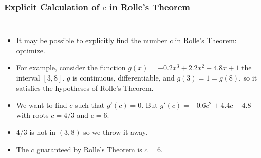 \documentclass[serif,ignorenonframetext]{beamer}
\begin{document}
\begin{frame}
  \frametitle{Explicit Calculation of $c$ in Rolle's Theorem}
  \begin{columns}
  \begin{itemize}[<+->]
  \item It may be possible to explicitly find the number $c$ 
    in Rolle's Theorem: optimize.
  \item For example, consider the function $g(x)=-0.2x^3+2.2x^2-4.8x+1$
    the interval $[3,8]$.  $g$ is continuous, differentiable, and
    $g(3)=1=g(8)$, so it satisfies the hypotheses of Rolle's Theorem.
  \item We want to find $c$ such that $g'(c)=0$.  But $g'(c)=-0.6c^2+4.4c-4.8$
    with roots $c=4/3$ and $c=6$.
  \item $4/3$ is not in $(3,8)$ so we throw it away.
  \item The $c$ guaranteed by Rolle's Theorem is $c=6$.
  \end{itemize}

\end{columns}
\end{frame}
\end{document}
